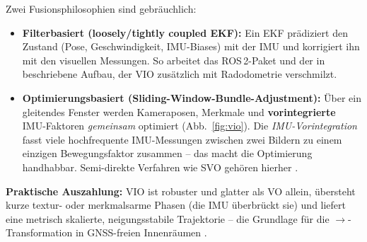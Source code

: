 \noindent Zwei Fusionsphilosophien sind gebräuchlich:
\begin{itemize}
\item \textbf{Filterbasiert (loosely/tightly coupled EKF):} Ein EKF prädiziert
  den Zustand (Pose, Geschwindigkeit, IMU-Biases) mit der IMU und korrigiert ihn
  mit den visuellen Messungen. So arbeitet das ROS\,2-Paket
   und der in \cite{barzegar2021wheel} beschriebene
  Aufbau, der VIO zusätzlich mit Radodometrie verschmilzt.
\item \textbf{Optimierungsbasiert (Sliding-Window-Bundle-Adjustment):} Über ein
  gleitendes Fenster werden Kameraposen, Merkmale und \textbf{vorintegrierte}
  IMU-Faktoren \emph{gemeinsam} optimiert (Abb.~\ref{fig:vio}). Die
  \emph{IMU-Vorintegration} fasst viele hochfrequente IMU-Messungen zwischen
  zwei Bildern zu einem einzigen Bewegungsfaktor zusammen -- das macht die
  Optimierung handhabbar. Semi-direkte Verfahren wie SVO gehören hierher
  \cite{godio2022vio}.
\end{itemize}
\textbf{Praktische Auszahlung:} VIO ist robuster und glatter als VO allein,
übersteht kurze textur- oder merkmalsarme Phasen (die IMU überbrückt sie) und
liefert eine metrisch skalierte, neigungsstabile Trajektorie -- die Grundlage
für die $\rightarrow$-Transformation in
GNSS-freien Innenräumen \cite{godio2022vio, barzegar2021wheel}.
